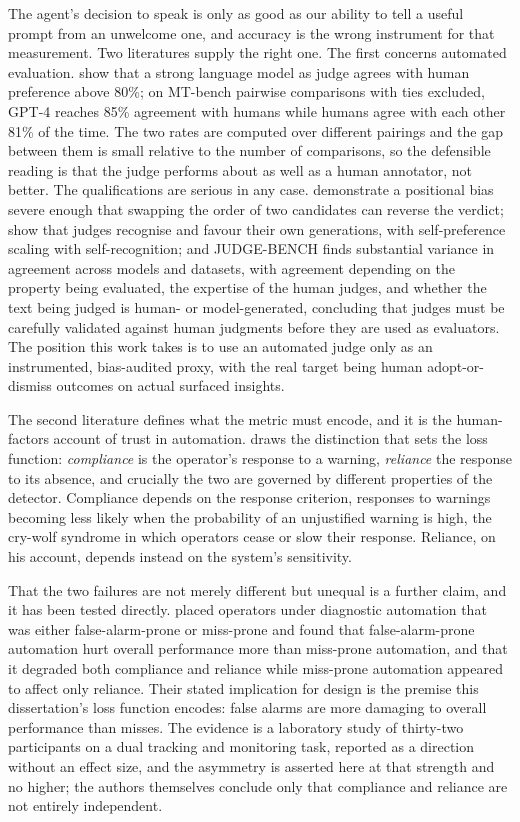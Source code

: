 The agent's decision to speak is only as good as our ability to tell a useful
prompt from an unwelcome one, and accuracy is the wrong instrument for that
measurement. Two literatures supply the right one. The first concerns
automated evaluation. \citet{zheng_judging_2023} show that a strong language
model as judge agrees with human preference above 80\%; on MT-bench pairwise
comparisons with ties excluded, GPT-4 reaches 85\% agreement with humans while
humans agree with each other 81\% of the time. The two rates are computed over
different pairings and the gap between them is small relative to the number of
comparisons, so the defensible reading is that the judge performs about as well
as a human annotator, not better. The qualifications are serious in any case.
\citet{wang_large_2024} demonstrate a positional bias severe enough that
swapping the order of two candidates can reverse the verdict;
\citet{panickssery_llm_2024} show that judges recognise and favour their own
generations, with self-preference scaling with self-recognition; and
JUDGE-BENCH \citep{bavaresco_llms_2025} finds substantial variance in agreement
across models and datasets, with agreement depending on the property being
evaluated, the expertise of the human judges, and whether the text being judged
is human- or model-generated, concluding that judges must be carefully
validated against human judgments before they are used as evaluators. The
position this work takes is to use an automated judge only as an instrumented,
bias-audited proxy, with the real target being human adopt-or-dismiss outcomes
on actual surfaced insights.

The second literature defines what the metric must encode, and it is the
human-factors account of trust in automation. \citet{meyer_conceptual_2004}
draws the distinction that sets the loss function: \emph{compliance} is the
operator's response to a warning, \emph{reliance} the response to its absence,
and crucially the two are governed by different properties of the detector.
Compliance depends on the response criterion, responses to warnings becoming
less likely when the probability of an unjustified warning is high, the
cry-wolf syndrome in which operators cease or slow their response. Reliance, on
his account, depends instead on the system's sensitivity.

That the two failures are not merely different but unequal is a further claim,
and it has been tested directly. \citet{dixon_independence_2007} placed
operators under diagnostic automation that was either false-alarm-prone or
miss-prone and found that false-alarm-prone automation hurt overall performance
more than miss-prone automation, and that it degraded both compliance and
reliance while miss-prone automation appeared to affect only reliance. Their
stated implication for design is the premise this dissertation's loss function
encodes: false alarms are more damaging to overall performance than misses. The
evidence is a laboratory study of thirty-two participants on a dual tracking
and monitoring task, reported as a direction without an effect size, and the
asymmetry is asserted here at that strength and no higher; the authors
themselves conclude only that compliance and reliance are not entirely
independent.


